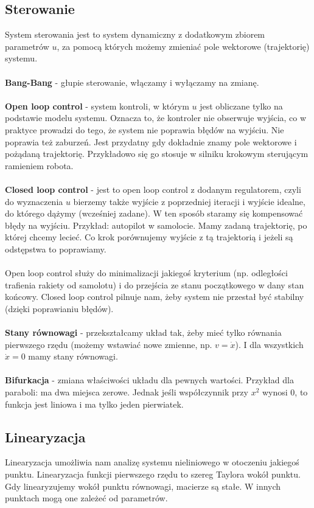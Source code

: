 \documentclass[12pt]{article}
\begin{document}
 \subsection{Sterowanie}
 System sterowania jest to system dynamiczny z dodatkowym zbiorem parametrów $u$, za pomocą których możemy zmieniać pole wektorowe (trajektorię) systemu. \\
 ~\\
 \textbf{Bang-Bang} - głupie sterowanie, włączamy i wyłączamy na zmianę.\\
 ~\\
 \textbf{Open loop control} - system kontroli, w którym $u$ jest obliczane tylko na podstawie modelu systemu. Oznacza to, że kontroler nie obserwuje wyjścia, co w praktyce prowadzi do tego, że system nie poprawia błędów na wyjściu. Nie poprawia też zaburzeń. Jest przydatny gdy dokładnie znamy pole wektorowe i pożądaną trajektorię. Przykładowo się go stosuje w silniku krokowym sterującym ramieniem robota.\\
 ~\\
 \textbf{Closed loop control} - jest to open loop control z dodanym regulatorem, czyli do wyznaczenia $u$ bierzemy także wyjście z poprzedniej iteracji i wyjście idealne, do którego dążymy (wcześniej zadane). W ten sposób staramy się kompensować błędy na wyjściu. Przykład: autopilot w samolocie. Mamy zadaną trajektorię, po której chcemy lecieć. Co krok porównujemy wyjście z tą trajektorią i jeżeli są odstępstwa to poprawiamy.\\
 ~\\
 Open loop control służy do minimalizacji jakiegoś kryterium (np. odległości trafienia rakiety od samolotu) i do przejścia ze stanu początkowego w dany stan końcowy. Closed loop control pilnuje nam, żeby system nie przestał być stabilny (dzięki poprawianiu błędów).\\
 ~\\
 \textbf{Stany równowagi} - przekształcamy układ tak, żeby mieć tylko równania pierwszego rzędu (możemy wstawiać nowe zmienne, np. $v = \dot{x}$). I dla wszystkich $\dot{x} = 0$ mamy stany równowagi.\\
 ~\\
 \textbf{Bifurkacja} - zmiana właściwości układu dla pewnych wartości. Przykład dla paraboli: ma dwa miejsca zerowe. Jednak jeśli współczynnik przy $x^{2}$ wynosi 0, to funkcja jest liniowa i ma tylko jeden pierwiatek.\\
 
 \subsection{Linearyzacja}
 Linearyzacja umożliwia nam analizę systemu nieliniowego w otoczeniu jakiegoś punktu. Linearyzacja funkcji pierwszego rzędu to szereg Taylora wokół punktu. Gdy linearyzujemy wokół punktu równowagi, macierze są stałe. W innych punktach mogą one zależeć od parametrów.
\end{document}
